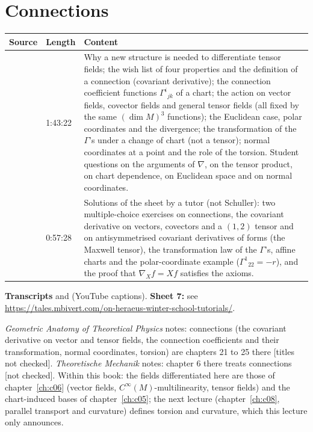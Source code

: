 \chapter{Connections}\label{ch:c07}
\begin{paracol}{2}

\begin{sources}
\begin{tabularx}{\linewidth}{@{}l l L@{}}
\toprule
\textbf{Source} & \textbf{Length} & \textbf{Content}\\
\midrule
{} & 1:43:22 & Why a new structure is needed to differentiate tensor fields; the wish list of four properties and the definition of a connection (covariant derivative); the connection coefficient functions $\Gamma^i{}_{jk}$ of a chart; the action on vector fields, covector fields and general tensor fields (all fixed by the same $(\dim M)^3$ functions); the Euclidean case, polar coordinates and the divergence; the transformation of the $\Gamma$'s under a change of chart (not a tensor); normal coordinates at a point and the role of the torsion. Student questions on the arguments of $\nabla$, on the tensor product, on chart dependence, on Euclidean space and on normal coordinates.\\
 & 0:57:28 & Solutions of the sheet by a tutor (not Schuller): two multiple-choice exercises on connections, the covariant derivative on vectors, covectors and a $(1,2)$ tensor and on antisymmetrised covariant derivatives of forms (the Maxwell tensor), the transformation law of the $\Gamma$'s, affine charts and the polar-coordinate example ($\Gamma^1{}_{22}=-r$), and the proof that $\nabla_Xf=Xf$ satisfies the axioms.\\
\bottomrule
\end{tabularx}

\smallskip
\textbf{Transcripts}  and  (YouTube captions).
\textbf{Sheet 7:} see \url{https://tales.mbivert.com/on-heraeus-winter-school-tutorials/}.
\end{sources}

\begin{reading}
\emph{Geometric Anatomy of Theoretical Physics} notes: connections (the covariant derivative on vector and tensor fields, the connection coefficients and their transformation, normal coordinates, torsion) are chapters 21 to 25 there [titles not checked]. \emph{Theoretische Mechanik} notes: chapter 6 there treats connections [not checked]. Within this book: the fields differentiated here are those of chapter~\ref{ch:c06} (vector fields, $C^\infty(M)$-multilinearity, tensor fields) and the chart-induced bases of chapter~\ref{ch:c05}; the next lecture (chapter~\ref{ch:c08}, parallel transport and curvature) defines torsion and curvature, which this lecture only announces.
\end{reading}


\end{paracol}
